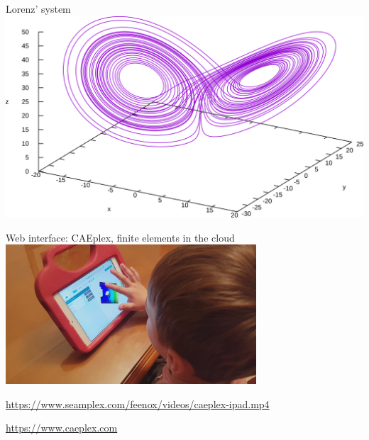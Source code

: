 \documentclass[
  ignorenonframetext,
  aspectratio=169,
]{beamer}
\begin{document}
\begin{frame}{Lorenz' system}
\protect\hypertarget{lorenz-system}{}
\includegraphics{lorenz.svg}
\end{frame}

\begin{frame}{Web interface: CAEplex, finite elements in the cloud}
\protect\hypertarget{web-interface-caeplex-finite-elements-in-the-cloud}{}
\centering \includegraphics[width=0.7\textwidth,height=\textheight]{caeplex-ipad.jpg}

\url{https://www.seamplex.com/feenox/videos/caeplex-ipad.mp4}

\url{https://www.caeplex.com}
\end{frame}
\end{document}
